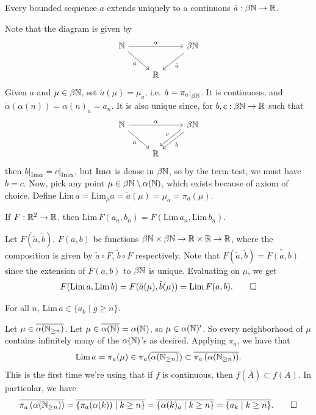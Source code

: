 \begin{simpleclaim}
    Every bounded sequence $a$ extends uniquely to a continuous $\tilde{a} : \beta \mathbb N \to \mathbb R$.
\end{simpleclaim}
\noindent Note that the diagram is given by
\[
    \begin{tikzcd}
        \NN \arrow[rr, "\alpha"] \arrow[dr, "a"'] & & \beta \NN \arrow[dl, "\tilde{a}"] \\
        & \RR &
    \end{tikzcd}
\]
Given $a$ and $\mu \in \beta \mathbb N$, set $\tilde{a}(\mu) = \mu_a$, i.e. $\tilde{a} = \restr{\pi_a}{\beta \NN}$. It is continuous, and $\tilde{\alpha}(\alpha(n)) = \alpha(n)_a = a_n$. It is also unique since, for $b, c : \beta \mathbb N \to \mathbb R$ such that 
\[
    \begin{tikzcd}
        \NN \arrow[rr, "\alpha"] \arrow[dr, "a"'] & & \beta \NN \arrow[dl, "b"] \arrow[dl, "c"', shift right = 1ex] \\
        & \RR &
    \end{tikzcd}
\]
then $\restr{b}{\Ima \alpha} = \restr{c}{\Ima \alpha}$, but $\text{Im} \alpha$ is dense in $\beta \mathbb N$, so by the term test, we must have $b = c$. Now, pick any point $\mu \in \beta \mathbb N \setminus \alpha(\mathbb N)$, which exists because of axiom of choice.  Define $\mathrm{Lim} \, a = \mathrm{Lim}_\mu a = \tilde{a}(\mu) = \mu_a = \pi_a (\mu)$.
\begin{simpleclaim}
    If $F : \mathbb R^2 \to \mathbb R$, then $\mathrm{Lim} \, F(a_n, b_n) = F(\mathrm{Lim} \, a_n, \mathrm{Lim} \, b_n)$.
\end{simpleclaim}
\noindent Let $F(\tilde{a}, \tilde{b})$, $F(a, b)$ be functions $\beta \mathbb N \times \beta \mathbb N \to \mathbb R \times \mathbb R \to \mathbb R$, where the composition is given by $\tilde{a} \circ F$, $\tilde{b} \circ F$ respectively. Note that $F(\tilde{a}, \tilde{b}) = \widetilde{F(a, b)}$ since the extension of $F(a, b)$ to $\beta \mathbb N$ is unique. Evaluating on $\mu$, we get
\[ F(\mathrm{Lim} \, a, \mathrm{Lim} \, b) = F(\tilde{a}(\mu), \tilde{b}(\mu)) = \mathrm{Lim} \, F(a, b). \qed \]

\begin{simpleclaim}
    For all $n$, $\mathrm{Lim} \, a \in \overline{\{ a_k \mid g \geq n \}}$.
\end{simpleclaim}
\noindent Let $\mu \in \overline{\alpha (\mathbb N_{\geq n})}$. Let $\mu \in \overline{\alpha(\mathbb N)} = \alpha(\mathbb N)$, so $\mu \in \alpha(\mathbb N)'$. So every neighborhood of $\mu$ contains infinitely many of the $\alpha(\mathbb N)$'s as desired. Applying $\pi_a$, we have that
\[ \mathrm{Lim} \, a = \pi_a(\mu) \in \pi_a( \overline{\alpha (\mathbb N_{\geq n})} ) \subset \overline{\pi_a \left(\alpha (\mathbb N_{\geq n}) \right)}. \]
This is the first time we're using that if $f$ is continuous, then $f(\overline{A}) \subset \overline{f(A)}$. In particular, we have
\[ \overline{\pi_a \left(\alpha (\mathbb N_{\geq n}) \right)} = \overline{\{\pi_a (\alpha(k)) \mid k \geq n\}} = \overline{\{\alpha(k)_a \mid k \geq n\}} = \overline{\{a_k \mid k \geq n\}}. \qed \]